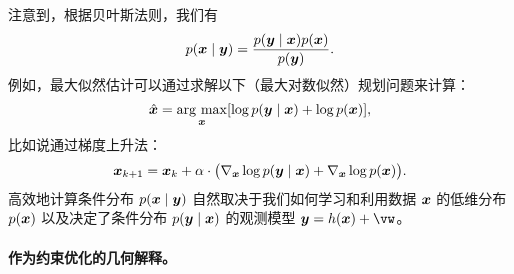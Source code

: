 \documentclass[../../book-main_zh.tex]{subfiles}
\begin{document}
注意到，根据贝叶斯法则，我们有
\begin{equation}
  p(\bm{x}\mid \bm{y}) = \frac{p(\bm{y}\mid \bm{x}) p(\bm{x}) }{p(\bm{y})}.
\end{equation} 
例如，最大似然估计可以通过求解以下（最大对数似然）规划问题来计算：
\begin{equation}
    \hat{\bm{x}} = \operatorname*{arg\ max}_{\bm{x}} [\log p(\bm{y}\mid \bm{x}) + \log p(\bm{x})], 
\end{equation}
比如说通过梯度上升法：
\begin{equation}
    \bm{x}_{k+1} = \bm{x}_k + \alpha \cdot \big(\nabla_{\bm{x}} \log p(\bm{y} \mid \bm{x}) + \nabla_{\bm{x}} \log p(\bm{x})\big).
    \label{eqn:loglikelihoo-gradient-ascent}
\end{equation}
高效地计算条件分布 $p(\bm{x} \mid \bm{y})$ 自然取决于我们如何学习和利用数据 $\bm{x}$ 的低维分布 $p(\bm{x})$ 以及决定了条件分布 $p(\bm{y} \mid \bm{x})$ 的观测模型 $\y = h(\x) + \vw$。

\paragraph{作为约束优化的几何解释。}
\end{document}
